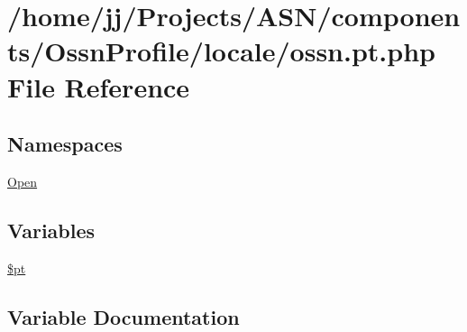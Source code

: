 \hypertarget{components_2_ossn_profile_2locale_2ossn_8pt_8php}{}\section{/home/jj/\+Projects/\+A\+S\+N/components/\+Ossn\+Profile/locale/ossn.pt.\+php File Reference}
\label{components_2_ossn_profile_2locale_2ossn_8pt_8php}
\subsection*{Namespaces}
\begin{DoxyCompactItemize}
\item 
 \hyperlink{namespace_open}{Open}
\end{DoxyCompactItemize}
\subsection*{Variables}
\begin{DoxyCompactItemize}
\item 
\hyperlink{components_2_ossn_profile_2locale_2ossn_8pt_8php_a62c150775a7a00e8663463c638016cad}{\$pt}
\end{DoxyCompactItemize}


\subsection{Variable Documentation}
